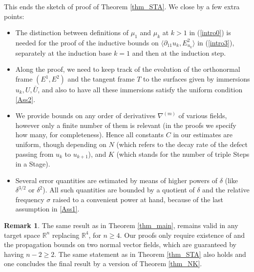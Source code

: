 \documentclass[reqno,twoside,11pt]{amsart}
\newcommand{\R}{\mathbb{R}}
\numberwithin{equation}{section}
\theoremstyle{plain}
\theoremstyle{definition}
\newtheorem{remark}[theorem]{Remark}
\begin{document}
This ends the sketch of proof of Theorem \ref{thm_STA}. We close by a few extra points:
\begin{itemize} 
\item[-] The distinction between definitions of $\mu_1$ and
$\mu_{k}$ at $k>1$ in (\ref{intro0}) is needed for the proof of the inductive bounds on
$\langle \partial_{11}u_k, E^2_{u_k}\rangle$ in (\ref{intro3}), separately at the
induction base $k=1$ and then at the induction step. 
\item[-] Along the proof, we need
to keep track of the evolution of the orthonormal frame $(E^1,
E^2)$ and the tangent frame $T$ to the surfaces given by immersions $u_k, U, \bar U$, and also
to have all these immersions satisfy
the uniform condition \ref{Ass2}. %
\item[-] We provide bounds on any order of derivatives $\nabla^{(m)}$ of various fields, however
only a finite number of them is relevant (in the proofs we specify how
many, for completeness). Hence all constants
$C$ in our estimates are uniform, though depending on $N$ (which
refers to the decay rate of the defect passing from $u_k$ to
$u_{k+1}$), and $K$ (which stands for the number of triple Steps in a Stage). 
\item[-] Several error quantities are estimated by means
of higher powers of $\delta$ (like $\delta^{3/2}$ or $\delta^2$). All such
quantities are bounded by a quotient of $\delta$ and
the relative frequency $\sigma$ raised to a convenient power at hand, because of the last
assumption in \ref{Ass1}. 
\end{itemize}

\medskip

\begin{remark}
The same result as in Theorem \ref{thm_main}, remains valid in any target
space $\R^n$ replacing $\R^4$, for $n\geq 4$. Our
proofs only require existence of and the propagation bounds on two
normal vector fields, which are guaranteed by
having $n-2\geq 2$. The same statement as in Theorem
\ref{thm_STA} also holds and one concludes the final result by a
version of Theorem \ref{thm_NK}.
\end{remark}


\medskip
\end{document}
